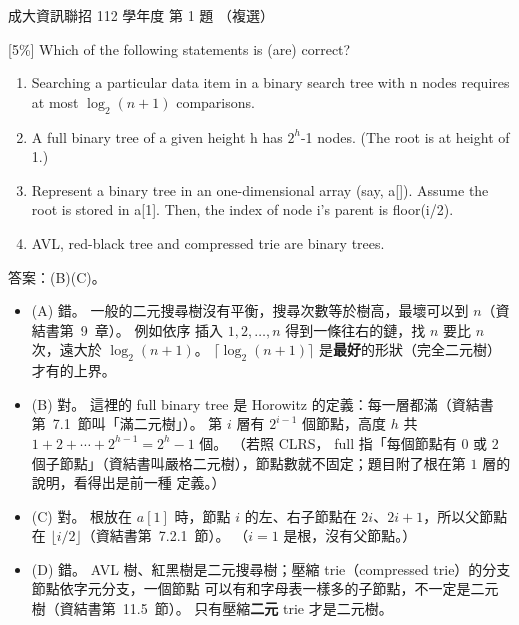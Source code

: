 \begin{pastexam}[label={px:ncku-112-prog-01}]{成大資訊聯招 112 學年度 第 1 題}
（複選）

{[5\%]} Which of the following statements is (are) correct?
\begin{enumerate}[label=(\Alph*)]
\item Searching a particular data item in a binary search tree with n nodes requires at most
$\log_2(n+1)$ comparisons.
\item A full binary tree of a given height h has $2^h$-1 nodes. (The root is at height of 1.)
\item Represent a binary tree in an one-dimensional array (say, a[]). Assume the root is stored in a[1].
Then, the index of node i's parent is floor(i/2).
\item AVL, red-black tree and compressed trie are binary trees.
\end{enumerate}
\end{pastexam}

\begin{pastsoln}
答案：(B)(C)。

\begin{itemize}
\item (A) 錯。 一般的二元搜尋樹沒有平衡，搜尋次數等於樹高，最壞可以到 $n$（資結書第~9~章）。 例如依序
插入 $1, 2, \ldots, n$ 得到一條往右的鏈，找 $n$ 要比 $n$ 次，遠大於 $\log_2(n+1)$。 $\lceil\log_2(n+1)\rceil$
是\textbf{最好}的形狀（完全二元樹）才有的上界。
\item (B) 對。 這裡的 full binary tree 是 Horowitz 的定義：每一層都滿（資結書第~7.1~節叫「滿二元樹」）。
第 $i$ 層有 $2^{i-1}$ 個節點，高度 $h$ 共 $1 + 2 + \cdots + 2^{h-1} = 2^h - 1$ 個。 （若照 CLRS，
full 指「每個節點有 $0$ 或 $2$ 個子節點」（資結書叫嚴格二元樹），節點數就不固定；題目附了根在第 $1$ 層的說明，看得出是前一種
定義。）
\item (C) 對。 根放在 $a[1]$ 時，節點 $i$ 的左、右子節點在 $2i$、$2i + 1$，所以父節點在
$\lfloor i/2 \rfloor$（資結書第~7.2.1~節）。 （$i = 1$ 是根，沒有父節點。）
\item (D) 錯。 AVL 樹、紅黑樹是二元搜尋樹；壓縮 trie（compressed trie）的分支節點依字元分支，一個節點
可以有和字母表一樣多的子節點，不一定是二元樹（資結書第~11.5~節）。 只有壓縮\textbf{二元} trie 才是二元樹。
\end{itemize}
\end{pastsoln}
